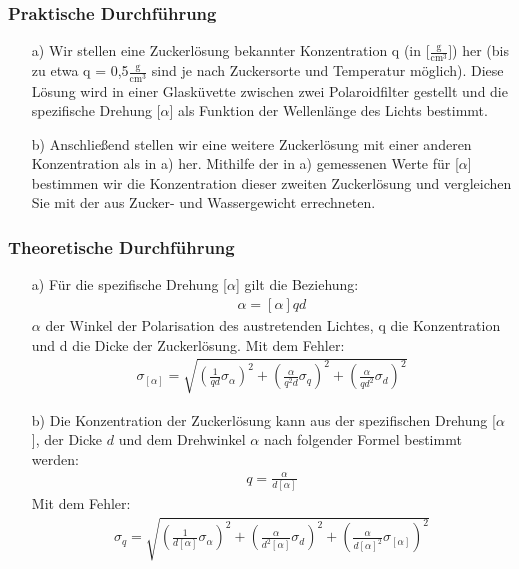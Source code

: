 \documentclass[12pt]{scrartcl}
\begin{document}
\subsubsection{Praktische Durchführung}
\begin{enumerate}
\item[a)] Wir stellen eine Zuckerlösung bekannter Konzentration q (in [$\frac{\text{g}}{\text{cm}^3}]$)
her (bis zu etwa q = 0,5$\frac{\text{g}}{\text{cm}^3}$
sind je nach Zuckersorte und Temperatur möglich).
Diese Lösung wird in einer Glasküvette zwischen zwei Polaroidfilter gestellt und die spezifische Drehung [$\alpha$]
als Funktion der Wellenlänge des Lichts bestimmt.
\item[b)] Anschließend stellen wir eine weitere Zuckerlösung mit einer anderen Konzentration als
in a) her. Mithilfe der in a) gemessenen Werte für
[$\alpha$] bestimmen wir die Konzentration dieser zweiten Zuckerlösung und vergleichen Sie mit der aus Zucker- und
Wassergewicht errechneten.
\end{enumerate}
\subsubsection{Theoretische Durchführung}
\begin{enumerate}
\item[a)] Für die spezifische Drehung [$\alpha$] gilt die Beziehung:
\begin{align}
\alpha = [\alpha] q d
\end{align}
$\alpha$ der Winkel der Polarisation des austretenden Lichtes, q die Konzentration und d die Dicke der Zuckerlösung.
Mit dem Fehler:
\begin{align}
\sigma_{[\alpha]} = \sqrt{
\left(\frac{1}{q d}\sigma_{\alpha}\right)^2+
\left(\frac{\alpha}{q^2 d}\sigma_q\right)^2+
\left(\frac{\alpha}{q d^2}\sigma_d\right)^2}
\end{align}
\item[b)]
Die Konzentration der Zuckerlösung kann aus der spezifischen Drehung [$\alpha$], der Dicke $d$ und dem Drehwinkel $\alpha$ nach folgender Formel bestimmt werden:
\begin{align}
q = \frac{\alpha}{d [\alpha]}
\end{align}
Mit dem Fehler:
\begin{align}
\sigma_q = \sqrt{
\left(\frac{1}{d [\alpha]}\sigma_\alpha \right)^2+
\left(\frac{\alpha}{d^2 [\alpha]}\sigma_d \right)^2+
\left(\frac{\alpha}{d [\alpha]^2}\sigma_{[\alpha]}\right)^2}
\end{align}
\end{enumerate}
\end{document}

